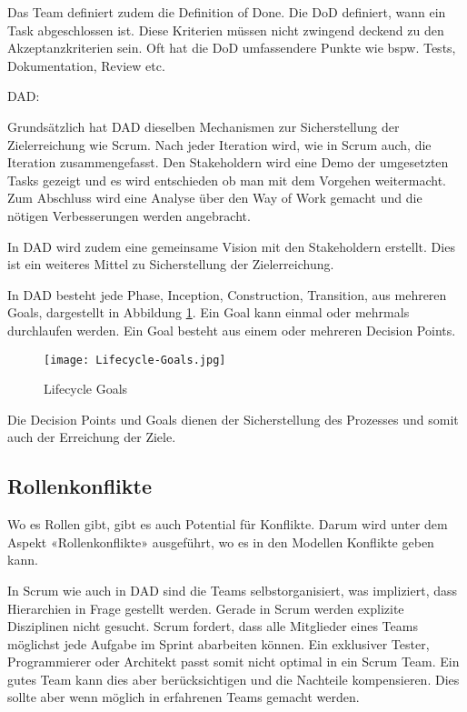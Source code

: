 Das Team definiert zudem die Definition of Done. Die DoD definiert, wann ein Task abgeschlossen ist. Diese Kriterien müssen nicht zwingend deckend zu den Akzeptanzkriterien sein. Oft hat die DoD umfassendere Punkte wie bspw. Tests, Dokumentation, Review etc.

\medskip
{\Large DAD:}\cite{processGoals} \medskip

Grundsätzlich hat DAD dieselben Mechanismen zur Sicherstellung der Zielerreichung wie Scrum. Nach jeder Iteration wird, wie in Scrum auch, die Iteration zusammengefasst. Den Stakeholdern wird eine Demo der umgesetzten Tasks gezeigt und es wird entschieden ob man mit dem Vorgehen weitermacht. Zum Abschluss wird eine Analyse über den Way of Work gemacht und die nötigen Verbesserungen werden angebracht.

In DAD wird zudem eine gemeinsame Vision mit den Stakeholdern erstellt. Dies ist ein weiteres Mittel zu Sicherstellung der Zielerreichung.

In DAD besteht jede Phase, Inception, Construction, Transition, aus mehreren Goals, dargestellt in Abbildung \ref{fig:goals}. Ein Goal kann einmal oder mehrmals durchlaufen werden. Ein Goal besteht aus einem oder mehreren Decision Points.

\begin{figure}[H]
	\centering
	\texttt{[image: Lifecycle-Goals.jpg]}
	\caption{Lifecycle Goals \cite{processGoals}}
	\label{fig:goals}
\end{figure}

Die Decision Points und Goals dienen der Sicherstellung des Prozesses und somit auch der Erreichung der Ziele.

\subsection{Rollenkonflikte \cite{rollenKonflikte}}

Wo es Rollen gibt, gibt es auch Potential für Konflikte. Darum wird unter dem Aspekt «Rollenkonflikte» ausgeführt, wo es in den Modellen Konflikte geben kann.

In Scrum wie auch in DAD sind die Teams selbstorganisiert, was impliziert, dass Hierarchien in Frage gestellt werden. Gerade in Scrum werden explizite Disziplinen nicht gesucht. Scrum fordert, dass alle Mitglieder eines Teams möglichst jede Aufgabe im Sprint abarbeiten können. Ein exklusiver Tester, Programmierer oder Architekt passt somit nicht optimal in ein Scrum Team. Ein gutes Team kann dies aber berücksichtigen und die Nachteile kompensieren. Dies sollte aber wenn möglich in erfahrenen Teams gemacht werden.


